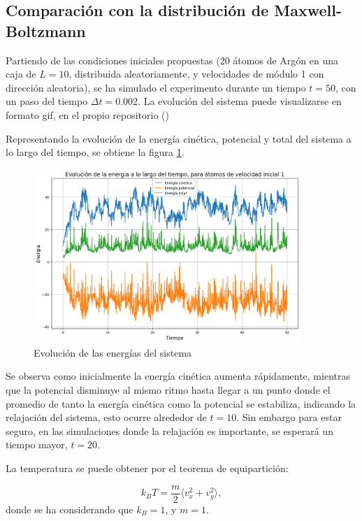 \documentclass[11pt, twoside]{article} %
\begin{document}
\subsection{Comparación con la distribución de Maxwell-Boltzmann}

Partiendo de las condiciones iniciales propuestas (20 átomos de Argón en una caja 
de $L=10$, distribuida aleatoriamente, y velocidades de módulo 1 con dirección aleatoria), se ha simulado el
experimento durante un tiempo $t = 50$, con un paso del tiempo 
$\Delta t = 0.002$. La evolución del sistema puede visualizarse en formato gif, 
en el propio repositorio ()

Representando la evolución de la energía cinética, potencial y total del sistema
a lo largo del tiempo, se obtiene la figura \ref{fig:energias}.

\begin{figure}[h!]
    \centering
    \includegraphics[width=0.9\textwidth]{plots/apartado_1_energia_1.png}
    \caption{Evolución de las energías del sistema}
    \label{fig:energias}
\end{figure}

Se observa como inicialmente la energía cinética aumenta rápidamente, mientras que
la potencial disminuye al mismo ritmo hasta llegar a un punto donde el promedio de 
tanto la energía cinética como la potencial se estabiliza, indicando la relajación 
del sistema, esto ocurre alrededor de $t=10$. Sin embargo para estar seguro, en las 
simulaciones donde la relajación es importante, se esperará un tiempo mayor, $t=20$.

La temperatura se puede obtener por el teorema de equipartición:

\begin{equation}
    k_B T = \frac{m}{2}\langle v_x^2 + v_y^2 \rangle,
\end{equation}
donde se ha considerando que $k_B =1$, y $m=1$.
\end{document}
